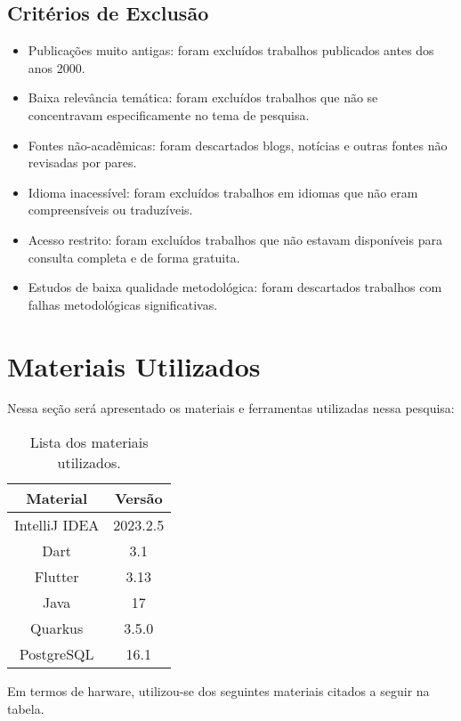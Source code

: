 \subsection{Critérios de Exclusão}\label{subsec:criterios-de-exclusao}

\begin{itemize}
    \item Publicações muito antigas: foram excluídos trabalhos publicados antes dos anos 2000.
    \item Baixa relevância temática: foram excluídos trabalhos que não se concentravam especificamente no tema de pesquisa.
    \item Fontes não-acadêmicas: foram descartados blogs, notícias e outras fontes não revisadas por pares.
    \item Idioma inacessível: foram excluídos trabalhos em idiomas que não eram compreensíveis ou traduzíveis.
    \item Acesso restrito: foram excluídos trabalhos que não estavam disponíveis para consulta completa e de forma gratuita.
    \item Estudos de baixa qualidade metodológica: foram descartados trabalhos com falhas metodológicas significativas.
\end{itemize}


\section{Materiais Utilizados}\label{sec:materiais-utilizados}
Nessa seção será apresentado os materiais e ferramentas utilizadas nessa pesquisa:

\begin{table}[H]
    \centering
    \label{tab:my-table}
    \begin{tabular}{|c|c|}
        \hline
        \textbf{Material} & \textbf{Versão} \\ \hline
        IntelliJ IDEA     & 2023.2.5        \\ \hline
        Dart              & 3.1             \\ \hline
        Flutter           & 3.13            \\ \hline
        Java              & 17              \\ \hline
        Quarkus           & 3.5.0           \\ \hline
        PostgreSQL        & 16.1            \\ \hline
    \end{tabular}
    \caption{Lista dos materiais utilizados.}
\end{table}

Em termos de harware, utilizou-se dos seguintes materiais citados a seguir na
tabela.